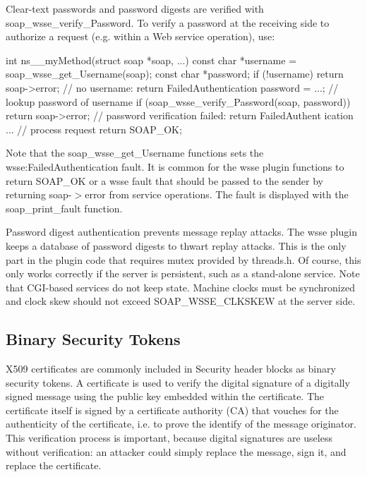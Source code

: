 Clear-\/text passwords and password digests are verified with soap\_\-wsse\_\-verify\_\-Password. To verify a password at the receiving side to authorize a request (e.g. within a Web service operation), use:


\begin{DoxyCode}
    int ns__myMethod(struct soap *soap, ...)
    { const char *username = soap_wsse_get_Username(soap);
      const char *password;
      if (!username)
        return soap->error; // no username: return FailedAuthentication
      password = ...; // lookup password of username
      if (soap_wsse_verify_Password(soap, password))
        return soap->error; // password verification failed: return FailedAuthent
      ication
      ... // process request
      return SOAP_OK;
    }
\end{DoxyCode}


Note that the soap\_\-wsse\_\-get\_\-Username functions sets the wsse:FailedAuthentication fault. It is common for the wsse plugin functions to return SOAP\_\-OK or a wsse fault that should be passed to the sender by returning soap-\/$>$error from service operations. The fault is displayed with the soap\_\-print\_\-fault function.

Password digest authentication prevents message replay attacks. The wsse plugin keeps a database of password digests to thwart replay attacks. This is the only part in the plugin code that requires mutex provided by threads.h. Of course, this only works correctly if the server is persistent, such as a stand-\/alone service. Note that CGI-\/based services do not keep state. Machine clocks must be synchronized and clock skew should not exceed SOAP\_\-WSSE\_\-CLKSKEW at the server side.\hypertarget{wsse_wsse_6_3}{}\subsection{Binary Security Tokens}\label{wsse_wsse_6_3}
X509 certificates are commonly included in Security header blocks as binary security tokens. A certificate is used to verify the digital signature of a digitally signed message using the public key embedded within the certificate. The certificate itself is signed by a certificate authority (CA) that vouches for the authenticity of the certificate, i.e. to prove the identify of the message originator. This verification process is important, because digital signatures are useless without verification: an attacker could simply replace the message, sign it, and replace the certificate.

